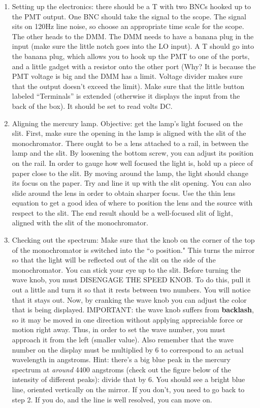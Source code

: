\documentclass{../lab}
\begin{document}
\begin{enumerate}
    \item Setting up the electronics: there should be a T with two BNCs hooked up to the PMT output. One BNC should take the signal to the scope. The signal sits on 120Hz line noise, so choose an appropriate time scale for the scope. The other heads to the DMM. The DMM needs to have a banana plug in the input (make sure the little notch goes into the LO input). A T should go into the banana plug, which allows you to hook up the PMT to one of the ports, and a little gadget with a resistor onto the other port (Why? It is because the PMT voltage is big and the DMM has a limit. Voltage divider makes sure that the output doesn't exceed the limit). Make sure that the little button labeled ``Terminals'' is extended (otherwise it displays the input from the back of the box). It should be set to read volts DC.

    \item Aligning the mercury lamp. Objective: get the lamp's light focused on the slit. First, make sure the opening in the lamp is aligned with the slit of the monochromator. There ought to be a lens attached to a rail, in between the lamp and the slit. By loosening the bottom screw, you can adjust its position on the rail. In order to gauge how well focused the light is, hold up a piece of paper close to the slit. By moving around the lamp, the light should change its focus on the paper. Try and line it up with the slit opening. You can also slide around the lens in order to obtain sharper focus. Use the thin lens equation to get a good idea of where to position the lens and the source with respect to the slit. The end result should be a well-focused slit of light, aligned with the slit of the monochromator.
    
\newpage
    
    \item Checking out the spectrum:  Make sure that the knob on the corner of the top of the monochromator is switched into the ``o position." This turns the mirror so that the light will be reflected out of the slit on the side of the monochromator. You can stick your eye up to the slit. Before turning the wave knob, you must DISENGAGE THE SPEED KNOB. To do this, pull it out a little and turn it so that it rests between two numbers. You will notice that it stays out. Now, by cranking the wave knob you can adjust the color that is being displayed. IMPORTANT: the wave knob suffers from \textbf{backlash}, so it may be moved in one direction without applying appreciable force or motion right away. Thus, in order to set the wave number, you must approach it from the left (smaller value). Also remember that the wave number on the display must be multiplied by 6 to correspond to an actual wavelength in angstroms. Hint: there's a big blue peak in the mercury spectrum at \textit{around} 4400 angstroms (check out the figure below of the intensity of different peaks): divide that by 6. You should see a bright blue line, oriented vertically on the mirror. If you don't, you need to go back to step 2. If you do, and the line is well resolved, you can move on.
    

\end{enumerate}
\end{document}
